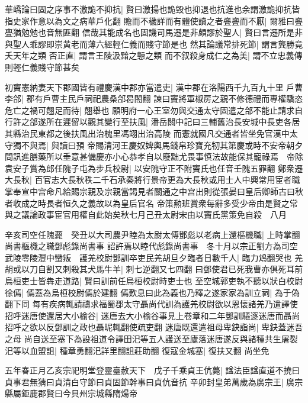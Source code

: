 華嶠論曰固之序事不激詭不抑抗|{
	賢曰激揚也詭毁也抑退也抗進也余謂激詭抑抗皆指史家作意以為文之病華戶化翻}
贍而不穢詳而有體使讀之者亹亹而不厭|{
	爾雅曰亹亹猶勉勉也音無匪翻}
信哉其能成名也固譏司馬遷是非頗謬於聖人|{
	賢曰言遷所是非與聖人乖謬即崇黄老而薄六經輕仁義而賤守節是也}
然其論議常排死節|{
	謂言龔勝竟夭天年之類}
否正直|{
	謂言王陵汲黯之戅之類}
而不叙殺身成仁之為美|{
	謂不立忠義傳}
則輕仁義賤守節甚矣

初竇憲納妻天下郡國皆有禮慶漢中郡亦當遣吏|{
	漢中郡在洛陽西千九百九十里}
戶曹李郃|{
	郡有戶曹主民戶祠祀農桑郃曷閤翻}
諫曰竇將軍椒房之親不修德禮而專權驕恣危亡之禍可翹足而待|{
	翹舉也}
願明府一心王室勿與交通太守固遣之郃不能止請求自行許之郃遂所在遲留以觀其變行至扶風|{
	潘岳關中記曰三輔舊治長安城中長吏各居其縣治民東都之後扶風出治槐里馮翊出治高陵}
而憲就國凡交通者皆坐免官漢中太守獨不與焉|{
	與讀曰預}
帝賜清河王慶奴婢輿馬錢帛珍寶充牣其第慶或時不安帝朝夕問訊進膳藥所以垂意甚備慶亦小心恭孝自以廢黜尤畏事慎法故能保其寵祿焉　帝除袁安子賞為郎任隗子屯為步兵校尉|{
	以安隗守正不附竇氏也任音壬隗五罪翻}
鄭衆遷大長秋|{
	百官志大長秋秩二千石承秦將行景帝更為大長秋或用士人中興常用宦者職掌奉宣中宫命凡給賜宗親及宗親當謁見者關通之中宫出則從張晏曰皇后卿師古曰秋者收成之時長者恒久之義故以為皇后官名}
帝策勲班賞衆每辭多受少帝由是賢之常與之議論政事宦官用權自此始矣秋七月己丑太尉宋由以竇氏黨策免自殺　八月

辛亥司空任隗薨　癸丑以大司農尹睦為太尉太傅鄧彪以老病上還樞機職|{
	上時掌翻尚書樞機之職鄧彪錄尚書事}
詔許焉以睦代彪錄尚書事　冬十月以宗正劉方為司空武陵零陵灃中蠻叛　護羌校尉鄧訓卒吏民羌胡旦夕臨者日數千人|{
	臨力鴆翻哭也}
羌胡或以刀自割又刺殺其犬馬牛羊|{
	刺七逆翻又七四翻}
曰鄧使君已死我曹亦俱死耳前烏桓吏士皆犇走道路|{
	賢曰訓前任烏桓校尉時吏士也}
至空城郭吏執不聽以狀白校尉徐傿|{
	傿蓋為烏桓校尉傿於建翻}
傿歎息曰此為義也乃釋之遂家家為訓立祠|{
	為于偽翻下同}
每有疾病輒請禱求福蜀郡太守聶尚代訓為護羌校尉欲以恩懷諸羌乃遣譯使招呼迷唐使還居大小榆谷|{
	迷唐去大小榆谷事見上卷章和二年鄧訓驅逐迷唐而聶尚招呼之欲以反鄧訓之政也聶昵輒翻使疏吏翻}
迷唐既還遣祖母卑鈌詣尚|{
	卑鈌蓋迷吾之母}
尚自送至塞下為設祖道令譯田汜等五人護送至廬落迷唐遂反與諸種共生屠裂汜等以血盟詛|{
	種章勇翻汜詳里翻詛莊助翻}
復寇金城塞|{
	復扶又翻}
尚坐免

五年春正月乙亥宗祀明堂登靈臺赦天下　戊子千乘貞王伉薨|{
	諡法臣諡直道不撓曰貞事君無猜曰貞清白守節曰貞固節幹事曰貞伉音抗}
辛卯封皇弟萬歲為廣宗王|{
	廣宗縣屬鉅鹿郡賢曰今貝州宗城縣隋煬帝}


